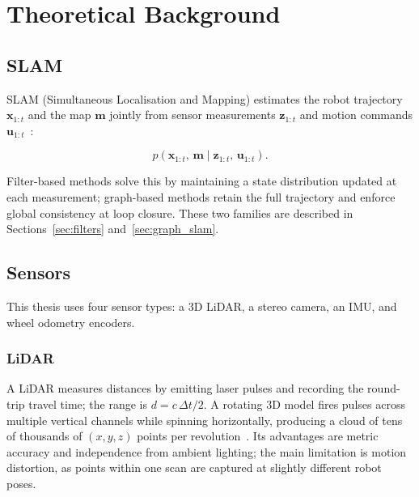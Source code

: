 \chapter{Theoretical Background}

\section{SLAM}

SLAM (Simultaneous Localisation and Mapping) estimates the robot trajectory
$\mathbf{x}_{1:t}$ and the map $\mathbf{m}$ jointly from sensor measurements
$\mathbf{z}_{1:t}$ and motion commands $\mathbf{u}_{1:t}$~\cite[p.~245]{thrun2005probabilistic}:

\begin{equation}
  p(\mathbf{x}_{1:t},\, \mathbf{m} \mid \mathbf{z}_{1:t},\, \mathbf{u}_{1:t}).
  \label{eq:slam_full}
\end{equation}

\noindent Filter-based methods solve this by maintaining a state distribution
updated at each measurement; graph-based methods retain the full trajectory and
enforce global consistency at loop closure.
These two families are described in Sections~\ref{sec:filters}
and~\ref{sec:graph_slam}.

\section{Sensors}
\label{sec:sensors}

This thesis uses four sensor types: a 3D LiDAR, a stereo camera, an IMU, and
wheel odometry encoders.

\subsection{LiDAR}

A LiDAR measures distances by emitting laser pulses and recording the
round-trip travel time; the range is $d = c\,\Delta t / 2$.
A rotating 3D model fires pulses across multiple vertical channels while
spinning horizontally, producing a cloud of tens of thousands of $(x,y,z)$
points per revolution~\cite{siegwart2004introduction}.
Its advantages are metric accuracy and independence from ambient lighting; the
main limitation is motion distortion, as points within one scan are captured at
slightly different robot poses.

